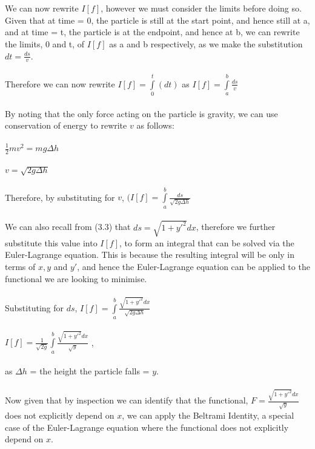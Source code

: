 \documentclass[12pt]{report}
\begin{document}
\\
\\
We can now rewrite \(I[f]\), however we must consider the limits before doing so. Given that at time = 0, the particle is still at the start point, and hence still at a, and at time = t, the particle is at the endpoint, and hence at b, we can rewrite the limits, 0 and t, of \(I[f]\) as a and b respectively, as we make the substitution \(dt = \frac{ds}{v}\).
\\
\\
Therefore we can now rewrite \(I[f] = \int\limits_0^t (dt)\) as \(I[f] = \int\limits_a^b \frac{ds}{v}\)
\\
\\
By noting that the only force acting on the particle is gravity, we can use conservation of energy to rewrite \(v\) as follows:
\\
\\
\(\frac{1}{2}mv^2 = mg\Delta h\)
\\
\\
\implies \(v = \sqrt{2g\Delta h}\)
\\
\\
Therefore, by substituting for \(v\), \((I[f] = \int\limits_a^b \frac{ds}{\sqrt{2g\Delta h}}\)
\\
\\
We can also recall from (3.3) that \(ds = \sqrt{1+y'^2} dx\), therefore we further substitute this value into \(I[f]\), to form an integral that can be solved via the Euler-Lagrange equation. This is because the resulting integral will be only in terms of \(x, y\) and \(y'\), and hence the Euler-Lagrange equation can be applied to the functional we are looking to minimise. 
\\
\\
Substituting for \(ds\), \(I[f] = \int\limits_a^b \frac{\sqrt{1+y'^2} dx}{\sqrt{2g\Delta h}}\)
\\
\\
\implies \(I[f] = \frac{1}{\sqrt{2g}}\int\limits_a^b \frac{\sqrt{1+y'^2} dx}{\sqrt{y}}\) ,
\\
\\
as \(\Delta h\) = the height the particle falls = \(y\).
\\
\\
Now given that by inspection we can identify that the functional, \(F = \frac{\sqrt{1+y'^2} dx}{\sqrt{y}}\) does not explicitly depend on \(x\), we can apply the Beltrami Identity, a special case of the Euler-Lagrange equation where the functional does not explicitly depend on \(x\).
\end{document}

